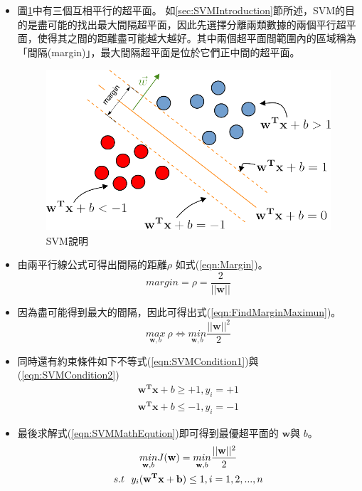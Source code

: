 \begin{itemize}
	\item
	      圖\ref{fig:SVMIllustrate}中有三個互相平行的超平面。
	      如\ref{sec:SVMIntroduction}節所述，SVM的目的是盡可能的找出最大間隔超平面，因此先選擇分離兩類數據的兩個平行超平面，使得其之間的距離盡可能越大越好。其中兩個超平面間範圍內的區域稱為「間隔(margin)」，最大間隔超平面是位於它們正中間的超平面。
	      \begin{figure}[H]
		      \centerline{\includegraphics[height=6cm]{./pic/kq2oRLsT.png}}
		      \caption{SVM說明}
		      \label{fig:SVMIllustrate}
	      \end{figure}

	\item
	      由兩平行線公式可得出間隔的距離\(\rho\) 如式(\ref{eqn:Margin})。
	      \begin{equation}
		      \label{eqn:Margin}
		      margin = \rho = \frac{2}{||\mathbf{w}||}
	      \end{equation}
	\item
	      因為盡可能得到最大的間隔，因此可得出式(\ref{eqn:FindMarginMaximun})。
	      \begin{equation}
		      \label{eqn:FindMarginMaximun}
		      \underset{\mathbf{w},b}{max}\ \rho \Leftrightarrow \underset{\mathbf{w},b}{min}\frac{||\mathbf{w}||^2}{2}
	      \end{equation}

	\item
	      同時還有約束條件如下不等式(\ref{eqn:SVMCondition1})與(\ref{eqn:SVMCondition2})
	      \begin{gather}
		      \label{eqn:SVMCondition1}
		      \mathbf{w^Tx}+b\geq +1, y_i = +1 \\
		      \label{eqn:SVMCondition2}
		      \mathbf{w^Tx}+b\leq -1, y_i = -1
	      \end{gather}

	\item
	      最後求解式(\ref{eqn:SVMMathEqution})即可得到最優超平面的 \(\mathbf{w}\)與 \(b\)。
	      \begin{gather}
			  \label{eqn:SVMMathEqution}
\underset{\mathbf{w},b}{min} J(\mathbf{w}) =\underset{\mathbf{w},b}{min}\frac{||\mathbf{w}||^2}{2}
			  \\ s.t \ \ y_i(\mathbf{w^Tx+b})\leq 1, i=1,2,...,n \notag
	      \end{gather}


\end{itemize}


